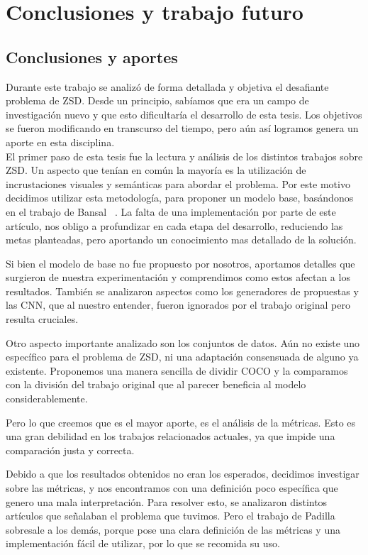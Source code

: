\chapter{Conclusiones y trabajo futuro} \label{cap:conclusiones}

\section{Conclusiones y aportes} \label{sec:conclusionesyaportes}
Durante este trabajo se analizó de forma detallada y objetiva el desafiante problema de ZSD. Desde un principio, sabíamos que era un campo de investigación nuevo y que esto dificultaría el desarrollo de esta tesis. Los objetivos se fueron modificando en transcurso del tiempo, pero aún así logramos genera un aporte en esta disciplina.\\

El primer paso de esta tesis fue la lectura y análisis de los distintos trabajos sobre ZSD. Un aspecto que tenían en común la mayoría es la utilización de incrustaciones visuales y semánticas para abordar el problema. Por este motivo decidimos utilizar esta metodología, para proponer un modelo base, basándonos en el trabajo de Bansal \etal~\cite{bansal2018zero}. La falta de una implementación por parte de este artículo, nos obligo a profundizar en cada etapa del desarrollo, reduciendo las metas planteadas, pero aportando un conocimiento mas detallado de la solución. 

Si bien el modelo de base no fue propuesto por nosotros, aportamos detalles que surgieron de nuestra experimentación y comprendimos como estos afectan a los resultados. También se analizaron aspectos como los generadores de propuestas y las CNN, que al nuestro entender, fueron ignorados por el trabajo original pero resulta cruciales.

Otro aspecto importante analizado son los conjuntos de datos. Aún no existe uno específico para el problema de ZSD, ni una adaptación consensuada de alguno ya existente. Proponemos una manera sencilla de dividir COCO y la comparamos con la división del trabajo original que al parecer beneficia al modelo considerablemente.

Pero lo que creemos que es el mayor aporte, es el análisis de la métricas. Esto es una gran debilidad en los trabajos relacionados actuales, ya que impide una comparación justa y correcta. 

Debido a que los resultados obtenidos no eran los esperados, decidimos investigar sobre las métricas, y nos encontramos con una definición poco específica que genero una mala interpretación. Para resolver esto, se analizaron distintos artículos que señalaban el problema que tuvimos. Pero el trabajo de Padilla \etal~\cite{padilla2020survey} sobresale a los demás, porque pose una clara definición de las métricas y una implementación fácil de utilizar, por lo que se recomida su uso.

